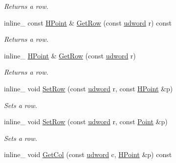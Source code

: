 \begin{DoxyCompactItemize}
\begin{DoxyCompactList}\small\item\em Returns a row. \end{DoxyCompactList}\item 
inline\+\_\+ const \hyperlink{classOpcode_1_1HPoint}{H\+Point} \& \hyperlink{classOpcode_1_1Matrix4x4_a2b20218d96c6bf46178393c9c10da075}{Get\+Row} (const \hyperlink{IceTypes_8h_a44c6f1920ba5551225fb534f9d1a1733}{udword} r) const \hypertarget{classOpcode_1_1Matrix4x4_a2b20218d96c6bf46178393c9c10da075}{}\label{classOpcode_1_1Matrix4x4_a2b20218d96c6bf46178393c9c10da075}

\begin{DoxyCompactList}\small\item\em Returns a row. \end{DoxyCompactList}\item 
inline\+\_\+ \hyperlink{classOpcode_1_1HPoint}{H\+Point} \& \hyperlink{classOpcode_1_1Matrix4x4_ac6fb5a0e639d0e221f302e09c01080b6}{Get\+Row} (const \hyperlink{IceTypes_8h_a44c6f1920ba5551225fb534f9d1a1733}{udword} r)\hypertarget{classOpcode_1_1Matrix4x4_ac6fb5a0e639d0e221f302e09c01080b6}{}\label{classOpcode_1_1Matrix4x4_ac6fb5a0e639d0e221f302e09c01080b6}

\begin{DoxyCompactList}\small\item\em Returns a row. \end{DoxyCompactList}\item 
inline\+\_\+ void \hyperlink{classOpcode_1_1Matrix4x4_aecfe4a796cb4cdd7e35deccd41129e81}{Set\+Row} (const \hyperlink{IceTypes_8h_a44c6f1920ba5551225fb534f9d1a1733}{udword} r, const \hyperlink{classOpcode_1_1HPoint}{H\+Point} \&p)\hypertarget{classOpcode_1_1Matrix4x4_aecfe4a796cb4cdd7e35deccd41129e81}{}\label{classOpcode_1_1Matrix4x4_aecfe4a796cb4cdd7e35deccd41129e81}

\begin{DoxyCompactList}\small\item\em Sets a row. \end{DoxyCompactList}\item 
inline\+\_\+ void \hyperlink{classOpcode_1_1Matrix4x4_a929ba9a3de02b021d853ee37247fdc5e}{Set\+Row} (const \hyperlink{IceTypes_8h_a44c6f1920ba5551225fb534f9d1a1733}{udword} r, const \hyperlink{classOpcode_1_1Point}{Point} \&p)\hypertarget{classOpcode_1_1Matrix4x4_a929ba9a3de02b021d853ee37247fdc5e}{}\label{classOpcode_1_1Matrix4x4_a929ba9a3de02b021d853ee37247fdc5e}

\begin{DoxyCompactList}\small\item\em Sets a row. \end{DoxyCompactList}\item 
inline\+\_\+ void \hyperlink{classOpcode_1_1Matrix4x4_a4fb24c32d1cda353823fd86d0d6ee4f8}{Get\+Col} (const \hyperlink{IceTypes_8h_a44c6f1920ba5551225fb534f9d1a1733}{udword} c, \hyperlink{classOpcode_1_1HPoint}{H\+Point} \&p) const \hypertarget{classOpcode_1_1Matrix4x4_a4fb24c32d1cda353823fd86d0d6ee4f8}{}\label{classOpcode_1_1Matrix4x4_a4fb24c32d1cda353823fd86d0d6ee4f8}


\end{DoxyCompactItemize}
